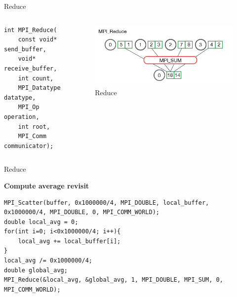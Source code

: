 \begin{frame}[fragile]{Reduce}
    \begin{columns}
    
\begin{column}{.5\textwidth}
\begin{verbatim}
int MPI_Reduce(
    const void* send_buffer,
    void* receive_buffer,
    int count,
    MPI_Datatype datatype,
    MPI_Op operation,
    int root,
    MPI_Comm communicator);
\end{verbatim}

\end{column}

\begin{column}{.5\textwidth}
\begin{figure}
    \centering
    \includegraphics[width=0.75\linewidth]{day8_am/img/mpi/reduce.png}
    \caption{Reduce}
    \label{fig:reduce}
\end{figure}
\end{column}
\end{columns}
\end{frame}

\begin{frame}[fragile]{Reduce}
    \begin{example}
        \textbf{Compute average revisit}
    \end{example}
     \begin{verbatim}
MPI_Scatter(buffer, 0x1000000/4, MPI_DOUBLE, local_buffer, 0x1000000/4, MPI_DOUBLE, 0, MPI_COMM_WORLD);
double local_avg = 0;
for(int i=0; i<0x1000000/4; i++){
    local_avg += local_buffer[i];
}
local_avg /= 0x1000000/4;
double global_avg;
MPI_Reduce(&local_avg, &global_avg, 1, MPI_DOUBLE, MPI_SUM, 0, MPI_COMM_WORLD);
\end{verbatim}
\end{frame}